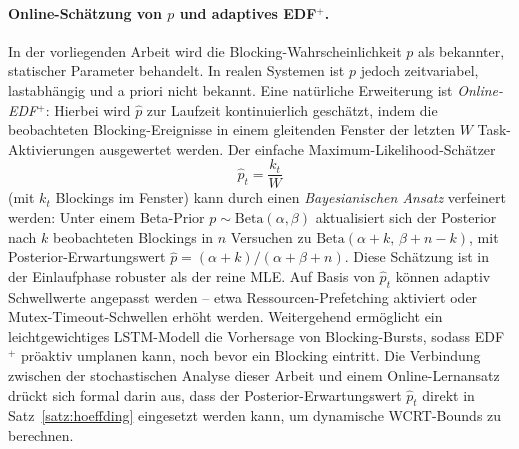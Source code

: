 ﻿\documentclass[a4paper,12pt]{article}
\theoremstyle{definition}
\begin{document}
	\paragraph{Online-Schätzung von $p$ und adaptives EDF$^+$.}
	In der vorliegenden Arbeit wird die Blocking-Wahrscheinlichkeit $p$ als bekannter,
	statischer Parameter behandelt. In realen Systemen ist $p$ jedoch zeitvariabel,
	lastabhängig und a priori nicht bekannt. Eine natürliche Erweiterung ist
	\emph{Online-EDF$^+$}: Hierbei wird $\hat{p}$ zur Laufzeit kontinuierlich geschätzt,
	indem die beobachteten Blocking-Ereignisse in einem gleitenden Fenster der letzten $W$
	Task-Aktivierungen ausgewertet werden. Der einfache Maximum-Likelihood-Schätzer
	\[
		\hat{p}_t = \frac{k_t}{W}
	\]
	(mit $k_t$ Blockings im Fenster) kann durch einen \emph{Bayesianischen Ansatz} verfeinert
	werden: Unter einem Beta-Prior $p \sim \mathrm{Beta}(\alpha, \beta)$ aktualisiert sich der
	Posterior nach $k$ beobachteten Blockings in $n$ Versuchen zu
	$\mathrm{Beta}(\alpha + k,\, \beta + n - k)$, mit Posterior-Erwartungswert
	$\hat{p} = (\alpha + k) / (\alpha + \beta + n)$.
	Diese Schätzung ist in der Einlaufphase robuster als der reine MLE.
	Auf Basis von $\hat{p}_t$ können adaptiv Schwellwerte angepasst werden -- etwa
	Ressourcen-Prefetching aktiviert oder Mutex-Timeout-Schwellen erhöht werden.
	Weitergehend ermöglicht ein leichtgewichtiges LSTM-Modell die Vorhersage von
	Blocking-Bursts, sodass EDF$^+$ pröaktiv umplanen kann, noch bevor ein Blocking
	eintritt. Die Verbindung zwischen der stochastischen Analyse dieser Arbeit und einem
	Online-Lernansatz drückt sich formal darin aus, dass der Posterior-Erwartungswert
	$\hat{p}_t$ direkt in Satz~\ref{satz:hoeffding} eingesetzt werden kann, um dynamische
	WCRT-Bounds zu berechnen.
\end{document}
